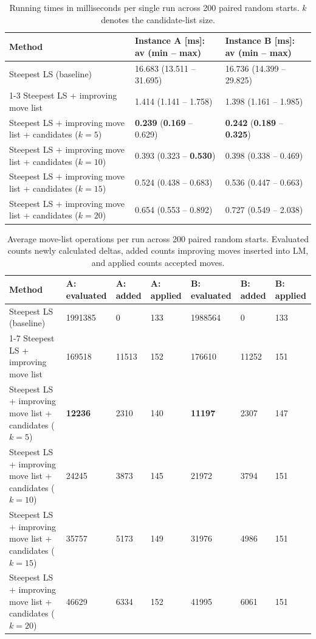 \begin{table}[h!]
\centering
\footnotesize
\setlength{\tabcolsep}{3pt}
\renewcommand{\arraystretch}{1.5}
\caption{Running times in milliseconds per single run across 200 paired random starts. $k$ denotes the candidate-list size.}
\label{tab:task5_time}
\vspace{0.5em}
\begin{tabularx}{\textwidth}{p{7.2cm} X X}
\toprule
\textbf{Method} & \textbf{Instance A [ms]: av (min -- max)} & \textbf{Instance B [ms]: av (min -- max)} \\
\midrule
Steepest LS (baseline) & 16.683 (13.511 -- 31.695) & 16.736 (14.399 -- 29.825) \\
\cmidrule{1-3}
Steepest LS + improving move list & 1.414 (1.141 -- 1.758) & 1.398 (1.161 -- 1.985) \\
Steepest LS + improving move list + candidates ($k = 5$) & \textbf{0.239} (\textbf{0.169} -- 0.629) & \textbf{0.242} (\textbf{0.189} -- \textbf{0.325}) \\
Steepest LS + improving move list + candidates ($k = 10$) & 0.393 (0.323 -- \textbf{0.530}) & 0.398 (0.338 -- 0.469) \\
Steepest LS + improving move list + candidates ($k = 15$) & 0.524 (0.438 -- 0.683) & 0.536 (0.447 -- 0.663) \\
Steepest LS + improving move list + candidates ($k = 20$) & 0.654 (0.553 -- 0.892) & 0.727 (0.549 -- 2.038) \\
\bottomrule
\end{tabularx}
\end{table}

\begin{table}[h!]
\centering
\footnotesize
\setlength{\tabcolsep}{3pt}
\renewcommand{\arraystretch}{1.5}
\caption{Average move-list operations per run across 200 paired random starts. Evaluated counts newly calculated deltas, added counts improving moves inserted into LM, and applied counts accepted moves.}
\label{tab:task5_moves}
\vspace{0.5em}
\begin{tabularx}{\textwidth}{p{5.8cm} X X X X X X}
\toprule
\textbf{Method} & \textbf{A: evaluated} & \textbf{A: added} & \textbf{A: applied} & \textbf{B: evaluated} & \textbf{B: added} & \textbf{B: applied} \\
\midrule
Steepest LS (baseline) & 1991385 & 0 & 133 & 1988564 & 0 & 133 \\
\cmidrule{1-7}
Steepest LS + improving move list & 169518 & 11513 & 152 & 176610 & 11252 & 151 \\
Steepest LS + improving move list + candidates ($k = 5$) & \textbf{12236} & 2310 & 140 & \textbf{11197} & 2307 & 147 \\
Steepest LS + improving move list + candidates ($k = 10$) & 24245 & 3873 & 145 & 21972 & 3794 & 151 \\
Steepest LS + improving move list + candidates ($k = 15$) & 35757 & 5173 & 149 & 31976 & 4986 & 151 \\
Steepest LS + improving move list + candidates ($k = 20$) & 46629 & 6334 & 152 & 41995 & 6061 & 151 \\
\bottomrule
\end{tabularx}
\end{table}

